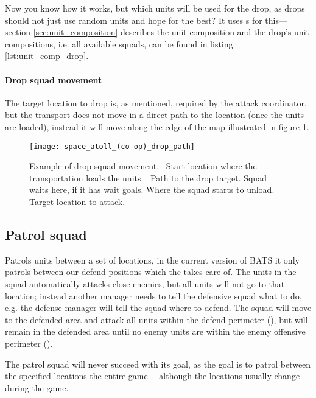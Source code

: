 Now you know how it works, but which units will be used for the drop, as drops should not just use
random units and hope for the best? It uses s for this—section
\ref{sec:unit_composition} describes the unit composition and the drop's unit compositions, i.e. all
available squads, can be found in listing \ref{lst:unit_comp_drop}. 



\paragraph{Drop squad movement}
The target location to drop is, as mentioned, required by the attack coordinator, but the transport does not move in a direct path to the location (once the units are loaded), instead it will move along the edge of the map illustrated in figure \ref{fig:drop_squad_movement}.
\begin{figure}[htb]
\centering
\texttt{[image: space\_atoll\_(co-op)\_drop\_path]}
\caption[Drop squad movement example]{Example of drop squad movement.
\usebox{\LegendDotGreen}~Start location where the transportation loads the units.
\usebox{\LegendLineCyan}~Path to the drop target.
\usebox{\LegendDotOrange}Squad waits here, if it has wait goals.
\usebox{\LegendDotYellow}Where the squad starts to unload.
\usebox{\LegendDotRed}Target location to attack.}
\label{fig:drop_squad_movement}
\end{figure}

\subsection{Patrol squad}
\label{sec:patrol_squad}
Patrols units between a set of locations, in the current version of BATS it only patrols between our defend positions which the  takes care of. The units in the squad automatically attacks close enemies, but all units will not go to that location; instead another manager needs to tell the defensive squad what to do, e.g. the defense manager will tell the squad where to defend. The squad will move to the defended area and attack all units within the defend perimeter (\squadDefendDefendPerimeter), but will remain in the defended area until no enemy units are within the enemy offensive perimeter (\squadDefendEnemyOffensivePerimeter).

The patrol squad will never succeed with its goal, as the goal is to patrol between the specified locations the entire game— although the locations usually change during the game.

